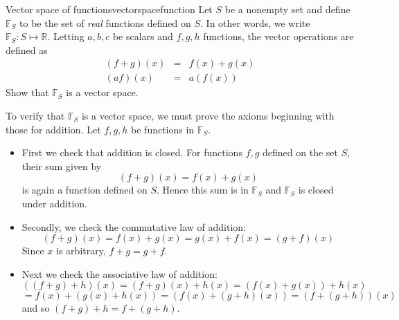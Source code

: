 \begin{example}{Vector space of functions}{vectorspacefunction}
Let $S$ be a nonempty set and define $\mathbb{F}_S$ to be the set of \textit{real} functions
defined on $S$. In other words, we write $\mathbb{F}_S: S \mapsto \mathbb{R}$. Letting $a,b,c$ be scalars and $f,g,h$ functions, the
vector operations are defined as
\begin{eqnarray*}
\left( f+g\right) \left( x\right)  &=&f\left( x\right) +g\left(
x\right)  \\
\left( af\right) \left( x\right)  &=&a\left( f\left( x\right) \right)
\end{eqnarray*}
Show that $\mathbb{F}_S$ is a vector space. 
\end{example}

\begin{solution}
To verify that $\mathbb{F}_S$ is a vector space, we must prove the axioms beginning with those for addition. Let $f, g, h$ be functions in $\mathbb{F}_S$. 

\begin{itemize}
\item
First we check that addition is closed.  For functions $f, g$ defined on the set $S$, their sum given by 
\[
(f+g)(x) = f(x)+g(x)
\]
is again a function defined on $S$. Hence this sum is in $\mathbb{F}_S$ and $\mathbb{F}_S$ is closed under addition. 

\item
Secondly, we check the commutative law of addition:
\begin{equation*}
\left( f+g\right) \left( x\right) =f\left( x\right) +g\left( x\right)
=g\left( x\right) +f\left( x\right) =\left( g+f\right) \left( x\right)
\end{equation*}
Since $x$ is arbitrary, $f+g=g+f$.

\item
Next we check the associative law of addition:
\begin{equation*}
\left( \left( f+g\right) +h\right) \left( x\right) = \left( f+g\right)
\left( x\right) +h\left( x\right) =\left( f\left( x\right) +g\left( x\right)
\right) +h\left( x\right)
\end{equation*}
\begin{equation*}
=f\left( x\right) +\left( g\left( x\right) +h\left( x\right) \right) =\left(
f\left( x\right) +\left( g+h\right) \left( x\right) \right) =\left( f+\left(
g+h\right) \right) \left( x\right)
\end{equation*}
and so $\left( f+g\right) +h=f+\left( g+h\right) .$


\end{itemize}
\end{solution}
